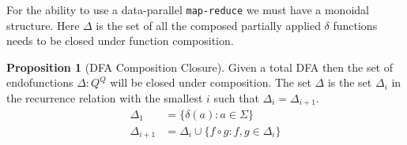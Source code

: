 \documentclass[a4paper,12pt]{article}
\theoremstyle{definition}
\newtheorem{proposition}{Proposition}[section]
\begin{document}
For the ability to use a data-parallel \texttt{map-reduce} we must have a monoidal structure. Here $\Delta$ is the set of all the composed partially applied $\delta$ functions needs to be closed under function composition.

\begin{proposition}[DFA Composition Closure]\label{prop:closure}
  Given a total DFA then the set of endofunctions $\Delta: Q^Q$ will be closed under composition. The set $\Delta$ is the set $\Delta_i$ in the recurrence relation with the smallest $i$ such that $\Delta_i = \Delta_{i + 1}$.
  \begin{align*}
    \Delta_1 &= \{\delta(a) : a \in \Sigma \} \\
    \Delta_{i + 1} &= \Delta_i \cup \{f \circ g : f, g \in \Delta_i\}
  \end{align*}
\end{proposition}
\end{document}
